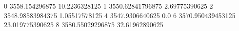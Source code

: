 0 3558.154296875 10.2236328125
1 3550.62841796875 2.69775390625
2 3548.98583984375 1.05517578125
4 3547.9306640625 0.0
6 3570.950439453125 23.019775390625
8 3580.55029296875 32.61962890625
